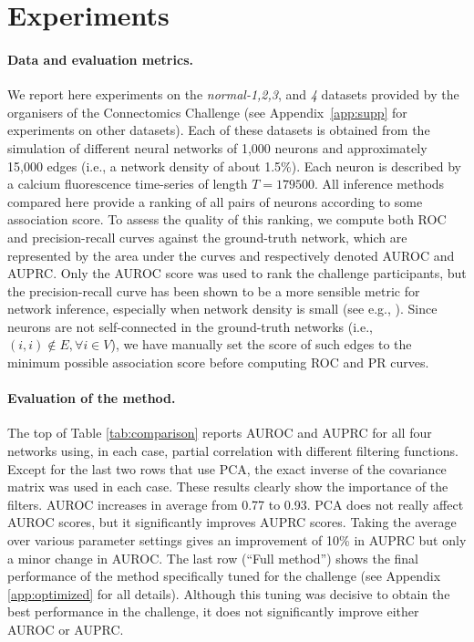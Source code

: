 \documentclass[wcp]{jmlr}
\begin{document}
\section{Experiments} \label{sec:results}


\paragraph{Data and evaluation metrics.}

We report here experiments on the \textit{normal-1,2,3}, and \textit{4}
datasets provided by the organisers of the Connectomics Challenge (see
Appendix~\ref{app:supp} for experiments on other datasets). Each of
these datasets is obtained from the simulation \citep{stetter2012model} of
different neural networks of 1,000 neurons and approximately 15,000 edges (i.e., a
network density of about 1.5\%). Each neuron is described by a calcium
fluorescence time-series of length $T=179500$. All inference methods compared
here provide a ranking of all pairs of neurons according to some association score. To assess the quality of this ranking, we compute both ROC and
precision-recall curves against the ground-truth network, which are represented by
the area under the curves and respectively  denoted AUROC and AUPRC. Only
the AUROC score was used to rank the challenge participants, but the precision-recall curve has been shown to be a more sensible metric for network
inference, especially when network density is small (see e.g.,
\cite{schrynemackers2013protocols}). Since neurons are not self-connected in
the ground-truth networks (i.e., $(i, i) \not \in E, \forall i \in V$), we
have manually set the score of such edges to the minimum possible association
score before computing ROC and PR curves.

\paragraph{Evaluation of the method.}

The top of Table \ref{tab:comparison} reports AUROC and AUPRC for all
four networks using, in each case, partial correlation with different
filtering functions. Except for the last two rows that use PCA, the
exact inverse of the covariance matrix was used in each case. These
results clearly show the importance of the filters. AUROC increases in
average from 0.77 to 0.93. PCA does not really affect AUROC scores, but
it significantly improves AUPRC scores. Taking the average over
various parameter settings gives an improvement of 10\% in AUPRC but
only a minor change in AUROC. The last row (``Full method'') shows the
final performance of the method specifically tuned for the challenge
(see Appendix \ref{app:optimized} for all details). Although this
tuning was decisive to obtain the best performance in the challenge,
it does not significantly improve either AUROC or AUPRC.
\end{document}
